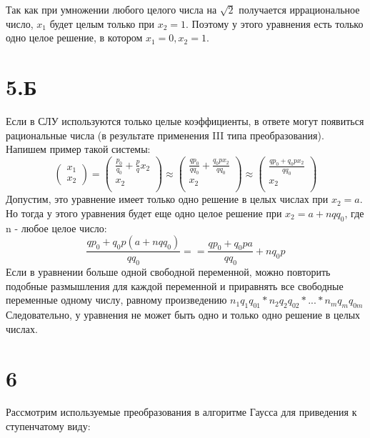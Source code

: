 \documentclass[a4paper]{article}
\begin{document}
Так как при умножении любого целого числа на $\sqrt{2}$ получается иррациональное число, $x_1$ будет целым только при $x_2 = 1$. Поэтому у этого уравнения есть только одно целое решение, в котором $x_1 = 0, x_2 = 1$.

\section*{5.Б}
Если в СЛУ используются только целые коэффициенты, в ответе могут появиться рациональные числа (в результате применения III типа преобразования).
Напишем пример такой системы:
\begin{equation*}
     \left(\begin{array}{r}
   x_1\\
   x_2
   \end{array}\right)
  =
       \left(\begin{array}{r}
    \frac{p_0}{q_0} + \frac{p}{q}  x_2\\ 
    x_2\\
   \end{array}\right)
 \approx
 \left(\begin{array}{r}
    \frac{qp_0}{qq_0} + \frac{q_0px_2}{qq_0} \\ 
    x_2\\
   \end{array}\right)
   \approx
 \left(\begin{array}{r}
    \frac{qp_0 + q_0px_2}{qq_0}\\ 
    x_2\\
   \end{array}\right)
\end{equation*}
Допустим, это уравнение имеет только одно решение в целых числах при $x_2 = a$. Но тогда у этого уравнения будет еще одно целое решение при $x_2 = a + nqq_0$, где n - любое целое число:
$$\frac{qp_0 + q_0p(a + nqq_0)}{qq_0} ==\frac{qp_0 + q_0pa}{qq_0} + nq_0p $$
Если в уравнении больше одной свободной переменной, можно повторить подобные размышления для каждой переменной и приравнять все свободные переменные одному числу, равному произведению $n_1q_1q_{01} * n_2q_2q_{02} * ... * n_mq_mq_{0m}$
Следовательно, у уравнения не может быть одно и только одно решение в целых числах.

\section*{6}
Рассмотрим используемые преобразования в алгоритме  Гаусса для приведения к ступенчатому виду:
\end{document}
